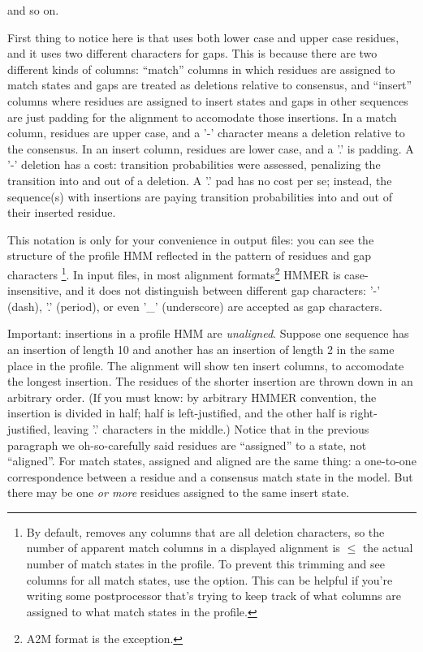 and so on. 

First thing to notice here is that  uses both lower
case and upper case residues, and it uses two different characters for
gaps.  This is because there are two different kinds of columns:
``match'' columns in which residues are assigned to match states and
gaps are treated as deletions relative to consensus, and ``insert''
columns where residues are assigned to insert states and gaps in other
sequences are just padding for the alignment to accomodate those
insertions. In a match column, residues are upper case, and a '-'
character means a deletion relative to the consensus. In an insert
column, residues are lower case, and a '.' is padding.  A '-' deletion
has a cost: transition probabilities were assessed, penalizing the
transition into and out of a deletion. A '.' pad has no cost per se;
instead, the sequence(s) with insertions are paying transition
probabilities into and out of their inserted residue.

This notation is only for your convenience in output files: you can
see the structure of the profile HMM reflected in the pattern of
residues and gap characters \footnote{By default, 
  removes any columns that are all deletion characters, so the number
  of apparent match columns in a displayed alignment is $\leq$ the
  actual number of match states in the profile. To prevent this
  trimming and see columns for all match states, use the
   option. This can be helpful if you're writing some
  postprocessor that's trying to keep track of what columns are
  assigned to what match states in the profile.}.  In input files, in
most alignment formats\footnote{A2M format is the exception.} HMMER is
case-insensitive, and it does not distinguish between different gap
characters: '-' (dash), '.' (period), or even '\_' (underscore) are
accepted as gap characters.

Important: insertions in a profile HMM are \emph{unaligned}. Suppose
one sequence has an insertion of length 10 and another has an
insertion of length 2 in the same place in the profile. The alignment
will show ten insert columns, to accomodate the longest insertion.
The residues of the shorter insertion are thrown down in an arbitrary
order. (If you must know: by arbitrary HMMER convention, the insertion
is divided in half; half is left-justified, and the other half is
right-justified, leaving '.' characters in the middle.)  Notice that
in the previous paragraph we oh-so-carefully said residues are
``assigned'' to a state, not ``aligned''. For match states, assigned
and aligned are the same thing: a one-to-one correspondence between a
residue and a consensus match state in the model. But there may be one
\emph{or more} residues assigned to the same insert state.

